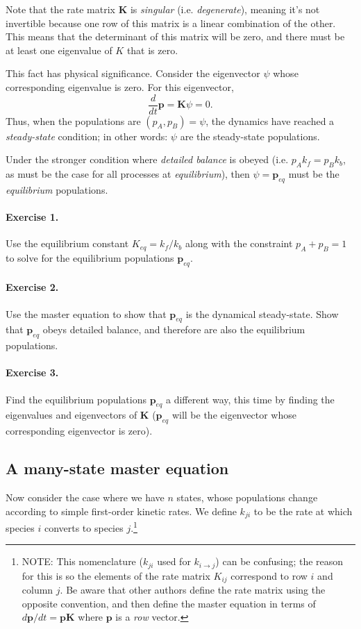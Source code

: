 \documentclass[11pt, oneside]{article}   	%
\begin{document}
Note that the rate matrix $\mathbf{K}$ is \textit{singular} (i.e. \textit{degenerate}), meaning it's not invertible because one row of this matrix is a linear combination of the other.  This means that the determinant of this matrix will be zero, and there must be at least one eigenvalue of $K$ that is zero.

This fact has physical significance.  Consider the eigenvector $\psi$ whose corresponding eigenvalue is zero.  For this eigenvector, 
\[
\frac{d}{dt} \mathbf{p} = \mathbf{K} \psi = 0.
\]
Thus, when the populations are $(p_A, p_B) = \psi$, the dynamics have reached a \textit{steady-state} condition; in other words: $\psi$ are the steady-state populations.

Under the stronger condition where \textit{detailed balance} is obeyed (i.e. $p_A k_f = p_B k_b$, as must be the case for all processes at \textit{equilibrium}), then $\psi = \mathbf{p}_{eq}$ must be the \textit{equilibrium} populations.

\paragraph{Exercise 1.} Use the equilibrium constant $K_{eq} = k_f/k_b$ along with the constraint $p_A + p_B = 1$ to solve for the equilibrium populations $\mathbf{p}_{eq}$.

\paragraph{Exercise 2.} Use the master equation to show that $\mathbf{p}_{eq}$ is the dynamical steady-state. Show that $\mathbf{p}_{eq}$ obeys detailed balance, and therefore are also the equilibrium populations.

\paragraph{Exercise 3.} Find the equilibrium populations $\mathbf{p}_{eq}$ a different way, this time by finding the eigenvalues and eigenvectors of $\mathbf{K}$ ($\mathbf{p}_{eq}$ will be the eigenvector whose corresponding eigenvector is zero).


\subsection*{A many-state master equation}
  
Now consider the case where we have $n$ states, whose populations change according to simple first-order kinetic rates.  We define $k_{ji}$ to be the rate at which species $i$ converts to species $j$.\footnote{NOTE: This nomenclature ($k_{ji}$ used for $k_{i \rightarrow j}$) can be confusing; the reason for this is so  the elements of the rate matrix $K_{ij}$ correspond to row $i$ and column $j$.   Be aware that other authors define the rate matrix using the opposite convention, and then define the master equation in terms of $d\mathbf{p}/dt = \mathbf{pK}$ where $\mathbf{p}$ is a \textit{row} vector.}
\end{document}
